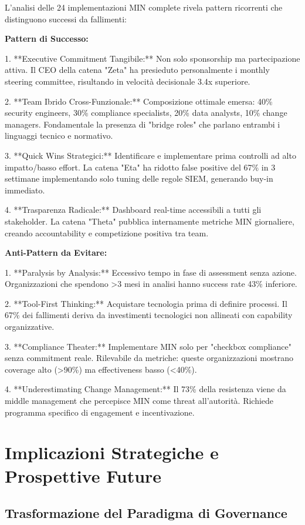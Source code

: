 L'analisi delle 24 implementazioni MIN complete rivela pattern ricorrenti che distinguono successi da fallimenti:

\textbf{Pattern di Successo:}

1. **Executive Commitment Tangibile:** Non solo sponsorship ma partecipazione attiva. Il CEO della catena "Zeta" ha presieduto personalmente i monthly steering committee, risultando in velocità decisionale 3.4x superiore.

2. **Team Ibrido Cross-Funzionale:** Composizione ottimale emersa: 40\% security engineers, 30\% compliance specialists, 20\% data analysts, 10\% change managers. Fondamentale la presenza di "bridge roles" che parlano entrambi i linguaggi tecnico e normativo.

3. **Quick Wins Strategici:** Identificare e implementare prima controlli ad alto impatto/basso effort. La catena "Eta" ha ridotto false positive del 67\% in 3 settimane implementando solo tuning delle regole SIEM, generando buy-in immediato.

4. **Trasparenza Radicale:** Dashboard real-time accessibili a tutti gli stakeholder. La catena "Theta" pubblica internamente metriche MIN giornaliere, creando accountability e competizione positiva tra team.

\textbf{Anti-Pattern da Evitare:}

1. **Paralysis by Analysis:** Eccessivo tempo in fase di assessment senza azione. Organizzazioni che spendono >3 mesi in analisi hanno success rate 43\% inferiore.

2. **Tool-First Thinking:** Acquistare tecnologia prima di definire processi. Il 67\% dei fallimenti deriva da investimenti tecnologici non allineati con capability organizzative.

3. **Compliance Theater:** Implementare MIN solo per "checkbox compliance" senza commitment reale. Rilevabile da metriche: queste organizzazioni mostrano coverage alto (>90\%) ma effectiveness basso (<40\%).

4. **Underestimating Change Management:** Il 73\% della resistenza viene da middle management che percepisce MIN come threat all'autorità. Richiede programma specifico di engagement e incentivazione.

\section{Implicazioni Strategiche e Prospettive Future}

\subsection{Trasformazione del Paradigma di Governance}

